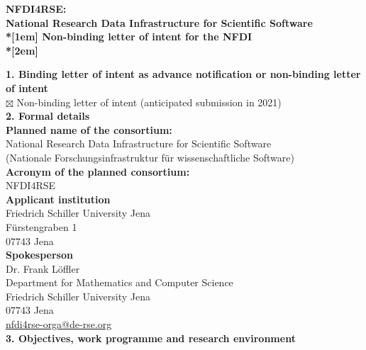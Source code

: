 \documentclass[11pt,a4paper,DIV=11]{scrlttr2}
\begin{document}
\newcommand{\mysec}[1]{\textbf{\hspace{-1cm}#1}\\}


\begin{letter}{}

\begin{centering}
\textbf{\large
NFDI4RSE:\\National Research Data Infrastructure for Scientific Software\\*[1em]
Non-binding letter of intent for the NFDI\\*[2em]
}
\end{centering}

\mysec{1. Binding letter of intent as advance notification or non-binding letter of intent}

$\boxtimes$ Non-binding letter of intent (anticipated submission in 2021)\\

\mysec{2. Formal details}

\textbf{Planned name of the consortium:}\\

National Research Data Infrastructure for Scientific Software\\
(Nationale Forschungsinfrastruktur für wissenschaftliche Software)\\

\textbf{Acronym of the planned consortium:}\\

NFDI4RSE\\

\textbf{Applicant institution}\\

Friedrich Schiller University Jena\\
Fürstengraben 1\\
07743 Jena\\

\textbf{Spokesperson}\\

Dr. Frank Löffler\\
Department for Mathematics and Computer Science\\
Friedrich Schiller University Jena\\
07743 Jena\\
\href{mailto:nfdi4rse-orga@de-rse.org}{nfdi4rse-orga@de-rse.org}\\

\clearpage
\mysec{3. Objectives, work programme and research environment}


\end{letter}
\end{document}

